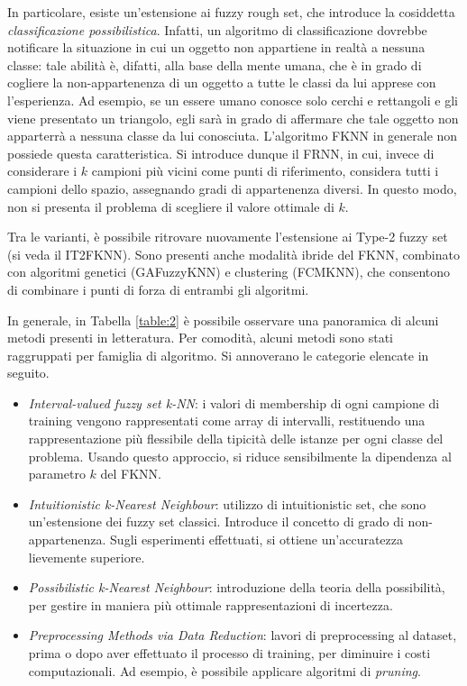 \documentclass[11pt,  oneside, openany]{book}
\begin{document}
In particolare, esiste un'estensione ai fuzzy rough set, che introduce la cosiddetta \textit{classificazione possibilistica}. Infatti, un algoritmo di classificazione dovrebbe notificare la situazione in cui un oggetto non appartiene in realtà a nessuna classe: tale abilità è, difatti, alla base della mente umana, che è in grado di cogliere la non-appartenenza di un oggetto a tutte le classi da lui apprese con l'esperienza. Ad esempio, se un essere umano conosce solo cerchi e rettangoli e gli viene presentato un triangolo, egli sarà in grado di affermare che tale oggetto non apparterrà a nessuna classe da lui conosciuta. L'algoritmo FKNN in generale non possiede questa caratteristica. Si introduce dunque il FRNN, in cui, invece di considerare i $k$ campioni più vicini come punti di riferimento, considera tutti i campioni dello spazio, assegnando gradi di appartenenza diversi. In questo modo, non si presenta il problema di scegliere il valore ottimale di $k$. 

Tra le varianti, è possibile ritrovare nuovamente l'estensione ai Type-2 fuzzy set (si veda il IT2FKNN). Sono presenti anche modalità ibride del FKNN, combinato con algoritmi genetici (GAFuzzyKNN) e clustering (FCMKNN), che consentono di combinare i punti di forza di entrambi gli algoritmi. 

In generale, in Tabella \ref{table:2} è possibile osservare una panoramica di alcuni metodi presenti in letteratura. Per comodità, alcuni metodi sono stati raggruppati per famiglia di algoritmo. Si annoverano le categorie elencate in seguito. 

\begin{itemize}
\item \textit{Interval-valued fuzzy set k-NN}: i valori di membership di ogni campione di training vengono rappresentati come array di intervalli, restituendo una rappresentazione più flessibile della tipicità delle istanze per ogni classe del problema. Usando questo approccio, si riduce sensibilmente la dipendenza al parametro $k$ del FKNN. 
\item \textit{Intuitionistic k-Nearest Neighbour}: utilizzo di intuitionistic set, che sono un'estensione dei fuzzy set classici. Introduce il concetto di grado di non-appartenenza. Sugli esperimenti effettuati, si ottiene un'accuratezza lievemente superiore. 
\item \textit{Possibilistic k-Nearest Neighbour}: introduzione della teoria della possibilità, per gestire in maniera più ottimale rappresentazioni di incertezza. 
\item \textit{Preprocessing Methods via Data Reduction}: lavori di preprocessing al dataset, prima o dopo aver effettuato il processo di training, per diminuire i costi computazionali. Ad esempio, è possibile applicare algoritmi di \textit{pruning}.
\end{itemize}
\end{document}

